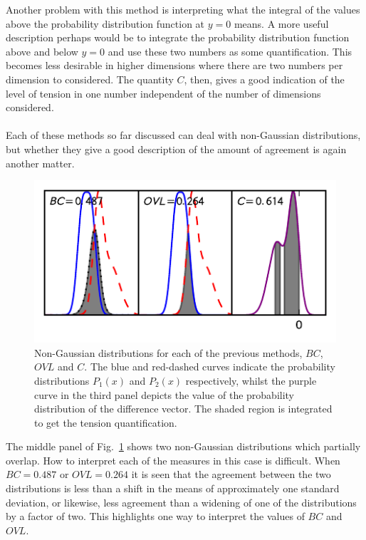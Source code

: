 \documentclass[twocolumn]{revtex4-1}
\begin{document}
    Another problem with this method is interpreting what the integral of the values above the probability distribution function at $y=0$ means.
    A more useful description perhaps would be to integrate the probability distribution function above and below $y=0$ and use these two numbers as some quantification.
    This becomes less desirable in higher dimensions where there are two numbers per dimension to considered.
    The quantity $C$, then, gives a good indication of the level of tension in one number independent of the number of dimensions considered.
    \\
    \\
    Each of these methods so far discussed can deal with non-Gaussian distributions, but whether they give a good description of the amount of agreement is again another matter.
    \begin{figure}
        \centering
        \includegraphics{../comparison/plots/skew.pdf}
        \caption{Non-Gaussian distributions for each of the previous methods, $BC$, $OVL$ and $C$.
                 The blue and red-dashed curves indicate the probability distributions $P_1(x)$ and $P_2(x)$ respectively, whilst the purple curve in the third panel depicts the value of the probability distribution of the difference vector.
                 The shaded region is integrated to get the tension quantification.}
        \label{fig:skew}
    \end{figure}
    \noindent The middle panel of Fig.~\ref{fig:skew} shows two non-Gaussian distributions which partially overlap.
    How to interpret each of the measures in this case is difficult.
    When $BC = 0.487$ or $OVL=0.264$ it is seen that the agreement between the two distributions is less than a shift in the means of approximately one standard deviation, or likewise, less agreement than a widening of one of the distributions by a factor of two.
    This highlights one way to interpret the values of $BC$ and $OVL$.
\end{document}
